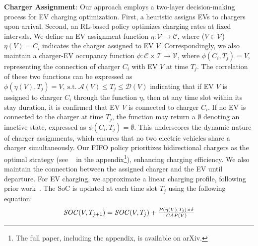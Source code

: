 \noindent \textbf{Charger Assignment}: 
{
Our approach employs a two-layer decision-making process for EV charging optimization. First, a heuristic assigns EVs to chargers upon arrival. Second, an RL-based policy optimizes charging rates at fixed intervals. 
}
We define an EV assignment function $\eta: \mathcal{V} \rightarrow \mathcal{C}$, where ($V \in \mathcal{V}$) $\eta(V) = C_i$ indicates the charger assigned to EV $V$. Correspondingly, we also maintain a charger-EV occupancy function $\phi: \mathcal{C} \times \mathcal{T} \rightarrow \mathcal{V}$, where $\phi(C_i, T_j) = V$, representing the connection of charger $C_i$ with EV $V$ at time $T_j$.  
The correlation of these two functions can be expressed as $\phi(\eta(V), T_j) = V, \ \text{s.t.}\ \mathcal{A}(V) \leq T_j \leq \mathcal{D}(V) $
indicating that if EV $V$ is assigned to charger $C_i$ through the function $\eta$, then at any time slot within its stay duration, it is confirmed that EV $V$ is connected to charger $C_i$. If no EV is connected to the charger at time $T_j$, the function may return a $\emptyset$ denoting an inactive state, expressed as $\phi(C_i, T_j) = \emptyset$. 
This underscores the dynamic nature of charger assignments, which ensures that no two electric vehicles share a charger simultaneously. Our FIFO policy prioritizes bidirectional chargers as the optimal strategy (see ~ in the appendix\footnote{The full paper, including the appendix, is available on arXiv.}), enhancing charging efficiency. 
We also maintain the connection between the assigned charger and the EV until departure. For EV charging, we approximate a linear charging profile, following prior work~\cite{sundstrom2010optimization}. The SoC is updated at each time slot  $T_j$  using the following equation: 
\begin{equation}
{\it SOC}(V, T_{j+1}) = {\it SOC}(V, T_j) + \textstyle\frac{P(\eta(V), T_j)\times \delta} {{\it CAP}(V)}
\label{eq: soc}
\end{equation} 


